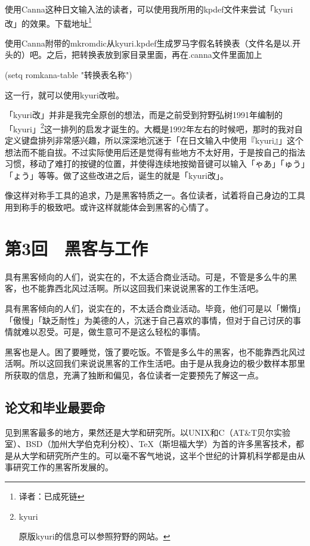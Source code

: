 \documentclass[a4paper,12pt]{article}
\newcommand\ja[1]{{\CJKfamily{gothic}#1}}
\begin{document}
使用Canna这种日文输入法的读者，可以使用我所用的kpdef文件来尝试「kyuri改」的效果。下载地址\footnote{译者：已成死链}

使用Canna附带的mkromdic从kyuri.kpdef生成罗马字假名转换表（文件名是以.开头的）吧。之后，把转换表放到家目录里面，再在.canna文件里面加上

(setq romkana-table "转换表名称")

这一行，就可以使用kyuri改啦。

「kyuri改」并非是我完全原创的想法，而是之前受到狩野弘树1991年编制的「kyuri」\footnote{kyuri

原版kyuri的信息可以参照狩野的网站。}这一排列的启发才诞生的。大概是1992年左右的时候吧，那时的我对自定义键盘排列非常感兴趣，所以深深地沉迷于「在日文输入中使用『kyuri』」这个想法而不能自拔。不过实际使用后还是觉得有些地方不太好用，于是按自己的指法习惯，移动了难打的按键的位置，并使得连续地按拗音键可以输入「\ja{ゃあ}」「\ja{ゅう}」「\ja{ょう}」等等。做了这些改进之后，诞生的就是「kyuri改」。

像这样对称手工具的追求，乃是黑客特质之一。各位读者，试着将自己身边的工具用到称手的极致吧。或许这样就能体会到黑客的心情了。


\section{第3回　黑客与工作}

具有黑客倾向的人们，说实在的，不太适合商业活动。可是，不管是多么牛的黑客，也不能靠西北风过活啊。所以这回我们来说说黑客的工作生活吧。

具有黑客倾向的人们，说实在的，不太适合商业活动。毕竟，他们可是以「懒惰」「傲慢」「缺乏耐性」为美德的人，沉迷于自己喜欢的事情，但对于自己讨厌的事情就难以忍受。可是，做生意可不是这么轻松的事情。

黑客也是人。困了要睡觉，饿了要吃饭。不管是多么牛的黑客，也不能靠西北风过活啊。所以这回我们来说说黑客的工作生活吧。由于是从我身边的极少数样本那里所获取的信息，充满了独断和偏见，各位读者一定要预先了解这一点。

\subsection{论文和毕业最要命}

见到黑客最多的地方，果然还是大学和研究所。以UNIX和C（AT\&T贝尔实验室）、BSD（加州大学伯克利分校）、TeX（斯坦福大学）为首的许多黑客技术，都是从大学和研究所产生的。可以毫不客气地说，这半个世纪的计算机科学都是由从事研究工作的黑客所发展的。
\end{document}
